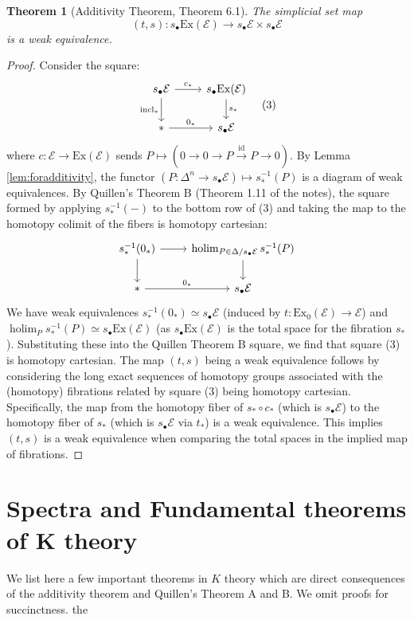 \documentclass[12pt]{report}
\numberwithin{equation}{section}
\DeclareMathOperator*{\holim}{ho{\lim}}
\newtheorem{theorem}[dummy]{Theorem}
\begin{document}
	\begin{theorem}[Additivity Theorem, Theorem 6.1]
		The simplicial set map
		\[ (t,s) : s_\bullet\mathrm{Ex}(\mathcal{E}) \to s_\bullet\mathcal{E} \times s_\bullet\mathcal{E} \]
		is a weak equivalence.
	\end{theorem}
	\begin{proof}
		Consider the square:
		\[
		\begin{tikzcd}
			s_\bullet\mathcal{E} \arrow[r, "c_*"] \arrow[d, "\text{incl}_*" swap] & s_\bullet\mathrm{Ex}(\mathcal{E}) \arrow[d, "s_*"] \\
			\ast \arrow[r, "0_*"] & s_\bullet\mathcal{E}
		\end{tikzcd}
		\quad (3)
		\]
		where $c: \mathcal{E} \to \mathrm{Ex}(\mathcal{E})$ sends $P \mapsto (0 \to 0 \to P \xrightarrow{\mathrm{id}} P \to 0)$.
		By Lemma \ref{lem:foradditivity}, the functor $(P: \Delta^n \to s_\bullet\mathcal{E}) \mapsto s_*^{-1}(P)$ is a diagram of weak equivalences.
		By Quillen's Theorem B (Theorem 1.11 of the notes), the square formed by applying $s_*^{-1}(-)$ to the bottom row of (3) and taking the map to the homotopy colimit of the fibers is homotopy cartesian:
		\[
		\begin{tikzcd}
			s_*^{-1}(0_*) \arrow[r] \arrow[d] & \holim_{P \in \Delta/s_\bullet\mathcal{E}} s_*^{-1}(P) \arrow[d] \\
			\ast \arrow[r, "0_*"] & s_\bullet\mathcal{E}
		\end{tikzcd}
		\]
		We have weak equivalences $s_*^{-1}(0_*) \simeq s_\bullet\mathcal{E}$ (induced by $t: \mathrm{Ex}_0(\mathcal{E}) \to \mathcal{E}$) and $\holim_{P} s_*^{-1}(P) \simeq s_\bullet\mathrm{Ex}(\mathcal{E})$ (as $s_\bullet\mathrm{Ex}(\mathcal{E})$ is the total space for the fibration $s_*$).
		Substituting these into the Quillen Theorem B square, we find that square (3) is homotopy cartesian.
		The map $(t,s)$ being a weak equivalence follows by considering the long exact sequences of homotopy groups associated with the (homotopy) fibrations related by square (3) being homotopy cartesian. Specifically, the map from the homotopy fiber of $s_* \circ c_*$ (which is $s_\bullet\mathcal{E}$) to the homotopy fiber of $s_*$ (which is $s_\bullet\mathcal{E}$ via $t_*$) is a weak equivalence. This implies $(t,s)$ is a weak equivalence when comparing the total spaces in the implied map of fibrations.
	\end{proof}
	

	
	
	
	\section{Spectra and Fundamental theorems of K theory}
	We list here a few important theorems in \( K \) theory which are direct consequences of the additivity theorem and Quillen's Theorem A and B. We omit proofs for succinctness. the
	
\end{document}
